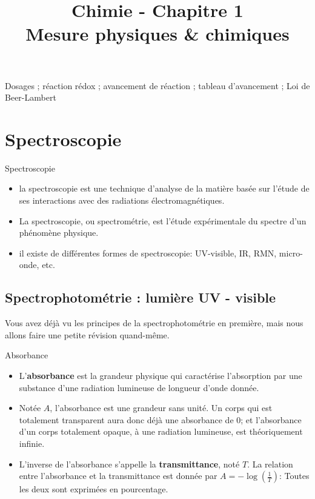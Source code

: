 \documentclass[11pt,a4paper]{article}
\title{\large Chimie - Chapitre 1 \\ \LARGE Mesure physiques \& chimiques}
\date{}
\author{}
\begin{document}
\maketitle
\vspace{-1cm}
\begin{tcolorbox}[title=Notions de la classe de première à rappeler]
Dosages ; réaction rédox ; avancement de réaction ; tableau d'avancement ; Loi de Beer-Lambert
\end{tcolorbox}
\tableofcontents

\section{Spectroscopie}
\begin{defn}{Spectroscopie}
\begin{itemize}
    \item la spectroscopie est une technique d'analyse de la matière basée sur l'étude de ses interactions avec des radiations électromagnétiques. 
    \item La spectroscopie, ou spectrométrie, est l'étude expérimentale du spectre  d'un phénomène physique. 
    \item il existe de différentes formes de spectroscopie: UV-visible, IR, RMN, micro-onde, etc. 
\end{itemize}
\end{defn}



\subsection{Spectrophotométrie : lumière UV - visible}
Vous avez déjà vu les principes de la spectrophotométrie en première, mais nous allons faire une petite révision quand-même. 

\begin{defn}{Absorbance}
\begin{itemize}
    \item L'\textbf{absorbance} est la grandeur physique qui caractérise l'absorption par une substance d'une radiation lumineuse de longueur d'onde donnée. 
    \item Notée $A$, l'absorbance est une grandeur sans unité. Un corps qui est totalement transparent aura donc déjà une absorbance de $0$; et l’absorbance d’un corps totalement opaque, à une radiation lumineuse, est théoriquement infinie. 
    \item L'inverse de l'absorbance s'appelle la \textbf{transmittance}, noté $T$. La relation entre l'absorbance et la transmittance est donnée par $ A = -\log(\frac{1}{T})$:  Toutes les deux sont exprimées en pourcentage. 
\end{itemize}
\end{defn}
\end{document}
